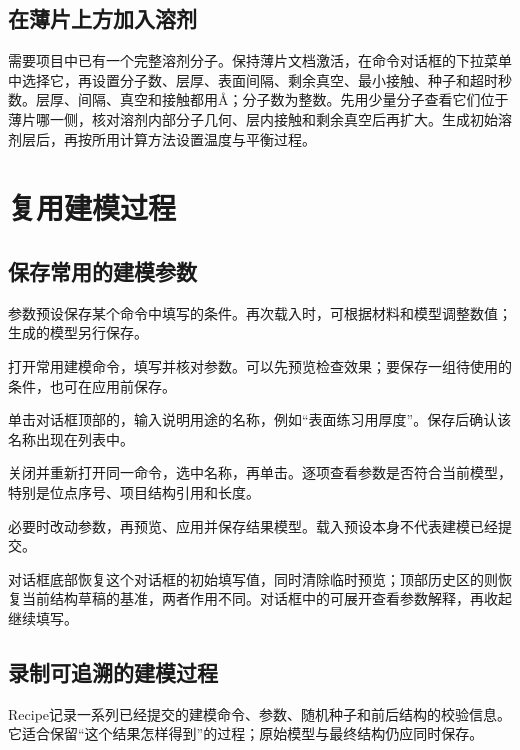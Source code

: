 \subsection{在薄片上方加入溶剂}

需要项目中已有一个完整溶剂分子。保持薄片文档激活，在命令对话框的下拉菜单中选择它，再设置分子数、层厚、表面间隔、剩余真空、最小接触、种子和超时秒数。层厚、间隔、真空和接触都用\AA；分子数为整数。先用少量分子查看它们位于薄片哪一侧，核对溶剂内部分子几何、层内接触和剩余真空后再扩大。生成初始溶剂层后，再按所用计算方法设置温度与平衡过程。

\section{复用建模过程}

\subsection{保存常用的建模参数}\label{sec:modeling-preset-reference}

参数预设保存某个命令中填写的条件。再次载入时，可根据材料和模型调整数值；生成的模型另行保存。

\begin{steps}
  \item 打开常用建模命令，填写并核对参数。可以先预览检查效果；要保存一组待使用的条件，也可在应用前保存。
  \item 单击对话框顶部的，输入说明用途的名称，例如“表面练习用厚度”。保存后确认该名称出现在列表中。
  \item 关闭并重新打开同一命令，选中名称，再单击。逐项查看参数是否符合当前模型，特别是位点序号、项目结构引用和长度。
  \item 必要时改动参数，再预览、应用并保存结果模型。载入预设本身不代表建模已经提交。
\end{steps}

对话框底部恢复这个对话框的初始填写值，同时清除临时预览；顶部历史区的则恢复当前结构草稿的基准，两者作用不同。对话框中的可展开查看参数解释，再收起继续填写。

\subsection{录制可追溯的建模过程}\label{sec:modeling-recipe-reference}

Recipe记录一系列已经提交的建模命令、参数、随机种子和前后结构的校验信息。它适合保留“这个结果怎样得到”的过程；原始模型与最终结构仍应同时保存。

